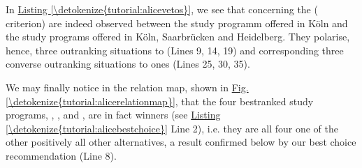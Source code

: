 \documentclass[a4paper,12pt,english]{sphinxhowto}
\begin{document}
In \hyperref[\detokenize{tutorial:alicevetos}]{Listing \ref{\detokenize{tutorial:alicevetos}}}, we see that  concerning the  ( criterion) are indeed observed between the  study programm offered in Köln and the  study programs offered in Köln, Saarbrücken and Heidelberg. They polarise, hence, three  outranking situations to  (Lines 9, 14, 19) and corresponding three  converse outranking situations to  ones (Lines 25, 30, 35).

We may finally notice in the relation map, shown in \hyperref[\detokenize{tutorial:alicerelationmap}]{Fig.\@ \ref{\detokenize{tutorial:alicerelationmap}}}, that the four best\sphinxhyphen{}ranked study programs, , ,  and ,  are in fact  winners (see \hyperref[\detokenize{tutorial:alicebestchoice}]{Listing \ref{\detokenize{tutorial:alicebestchoice}}} Line 2), i.e. they are all four  one of the other  positively  all other alternatives, a result confirmed below by our best choice recommendation (Line 8).
\def\sphinxLiteralBlockLabel{\label{\detokenize{tutorial:alicebestchoice}}}
\end{document}
